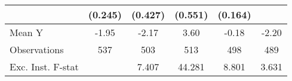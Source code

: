 {\begin{tabular}{l*{5}{c}}
            &     (0.245)         &     (0.427)         &     (0.551)         &     (0.164)         &                     \\
\midrule
Mean Y      &       -1.95         &       -2.17         &        3.60         &       -0.18         &       -2.20         \\
Observations&         537         &         503         &         513         &         498         &         489         \\
Exc. Inst. F-stat&                     &       7.407         &      44.281         &       8.801         &       3.631         \\
\bottomrule
\end{tabular}
}
